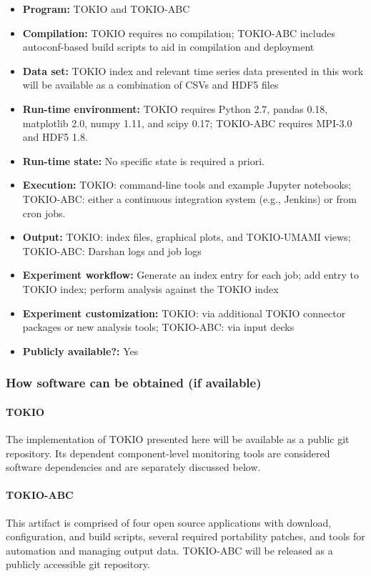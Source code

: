 {\small
\begin{itemize}
  \item {\bf Program: } TOKIO and TOKIO-ABC
  \item {\bf Compilation: } TOKIO requires no compilation; TOKIO-ABC includes autoconf-based build scripts to aid in compilation and deployment
  \item {\bf Data set: } TOKIO index and relevant time series data presented in this work will be available as a combination of CSVs and HDF5 files
  \item {\bf Run-time environment: } TOKIO requires Python 2.7, pandas 0.18, matplotlib 2.0, numpy 1.11, and scipy 0.17; TOKIO-ABC requires MPI-3.0 and HDF5 1.8.
  \item {\bf Run-time state: } No specific state is required a priori.
  \item {\bf Execution: } TOKIO: command-line tools and example Jupyter notebooks; TOKIO-ABC: either a continuous integration system (e.g., Jenkins) or from cron jobs.
  \item {\bf Output: } TOKIO: index files, graphical plots, and TOKIO-UMAMI views; TOKIO-ABC: Darshan logs and job logs
  \item {\bf Experiment workflow: } Generate an index entry for each job; add entry to TOKIO index; perform analysis against the TOKIO index
  \item {\bf Experiment customization: } TOKIO: via additional TOKIO connector packages or new analysis tools; TOKIO-ABC: via input decks
  \item {\bf Publicly available?: } Yes
\end{itemize}
}

\subsubsection{How software can be obtained (if available)}

\paragraph{TOKIO}
The implementation of TOKIO presented here will be available as a public git repository.
Its dependent component-level monitoring tools are considered software dependencies and are separately discussed below.

\paragraph{TOKIO-ABC}
This artifact is comprised of four open source applications with download, configuration, and build scripts, several required portability patches, and tools for automation and managing output data.
TOKIO-ABC will be released as a publicly accessible git repository.

